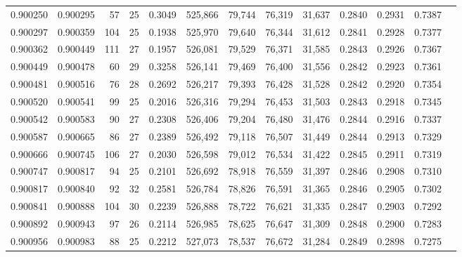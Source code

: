 \begin{tabular}{rrrrrrrrrrrrr}
0.900250 & 0.900295 &    57 &  25 &                                     0.3049 & 525,866 &  79,744 &  76,319 &  31,637 & 0.2840 & 0.2931 & 0.7387 \\
0.900297 & 0.900359 &   104 &  25 &                                     0.1938 & 525,970 &  79,640 &  76,344 &  31,612 & 0.2841 & 0.2928 & 0.7377 \\
0.900362 & 0.900449 &   111 &  27 &                                     0.1957 & 526,081 &  79,529 &  76,371 &  31,585 & 0.2843 & 0.2926 & 0.7367 \\
0.900449 & 0.900478 &    60 &  29 &                                     0.3258 & 526,141 &  79,469 &  76,400 &  31,556 & 0.2842 & 0.2923 & 0.7361 \\
0.900481 & 0.900516 &    76 &  28 &                                     0.2692 & 526,217 &  79,393 &  76,428 &  31,528 & 0.2842 & 0.2920 & 0.7354 \\
0.900520 & 0.900541 &    99 &  25 &                                     0.2016 & 526,316 &  79,294 &  76,453 &  31,503 & 0.2843 & 0.2918 & 0.7345 \\
0.900542 & 0.900583 &    90 &  27 &                                     0.2308 & 526,406 &  79,204 &  76,480 &  31,476 & 0.2844 & 0.2916 & 0.7337 \\
0.900587 & 0.900665 &    86 &  27 &                                     0.2389 & 526,492 &  79,118 &  76,507 &  31,449 & 0.2844 & 0.2913 & 0.7329 \\
0.900666 & 0.900745 &   106 &  27 &                                     0.2030 & 526,598 &  79,012 &  76,534 &  31,422 & 0.2845 & 0.2911 & 0.7319 \\
0.900747 & 0.900817 &    94 &  25 &                                     0.2101 & 526,692 &  78,918 &  76,559 &  31,397 & 0.2846 & 0.2908 & 0.7310 \\
0.900817 & 0.900840 &    92 &  32 &                                     0.2581 & 526,784 &  78,826 &  76,591 &  31,365 & 0.2846 & 0.2905 & 0.7302 \\
0.900841 & 0.900888 &   104 &  30 &                                     0.2239 & 526,888 &  78,722 &  76,621 &  31,335 & 0.2847 & 0.2903 & 0.7292 \\
0.900892 & 0.900943 &    97 &  26 &                                     0.2114 & 526,985 &  78,625 &  76,647 &  31,309 & 0.2848 & 0.2900 & 0.7283 \\
0.900956 & 0.900983 &    88 &  25 &                                     0.2212 & 527,073 &  78,537 &  76,672 &  31,284 & 0.2849 & 0.2898 & 0.7275 \\

\end{tabular}
